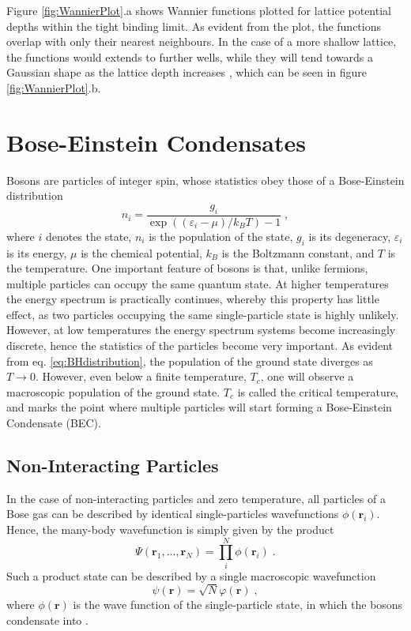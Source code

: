 Figure \ref{fig:WannierPlot}.a shows Wannier functions plotted for lattice potential depths within the tight binding limit. As evident from the plot, the functions overlap with only their nearest neighbours. In the case of a more shallow lattice, the functions would extends to further wells, while they will tend towards a Gaussian shape as the lattice depth increases \cite{greiner}, which can be seen in figure \ref{fig:WannierPlot}.b.



\section{Bose-Einstein Condensates}

Bosons are particles of integer spin, whose statistics obey those of a Bose-Einstein distribution
\begin{equation}
	n_i = \frac{g_i}{\exp \left( \left( \varepsilon_i -\mu \right) / k_B T \right) - 1} \; , \label{eq:BHdistribution}
\end{equation} 
where $i$ denotes the state, $n_i$ is the population of the state, $g_i$ is its degeneracy, $\varepsilon_i$ is its energy, $\mu$ is the chemical potential, $k_B$ is the Boltzmann constant, and $T$ is the temperature. One important feature of bosons is that, unlike fermions, multiple particles can occupy the same quantum state. At higher temperatures the energy spectrum is practically continues, whereby this property has little effect, as two particles occupying the same single-particle state is highly unlikely. However, at low temperatures the energy spectrum systems become increasingly discrete, hence the statistics of the particles become very important. As evident from eq. \eqref{eq:BHdistribution}, the population of the ground state diverges as $T \to 0$. However, even below a finite temperature, $T_c$, one will observe a macroscopic population of the ground state. $T_c$ is called the critical temperature, and marks the point where multiple particles will start forming a Bose-Einstein Condensate (BEC). \cite{pethick2002bose}

\subsection{Non-Interacting Particles}
In the case of non-interacting particles and zero temperature, all particles of a Bose gas can be described by identical single-particles wavefunctions $\phi (\boldsymbol{r}_i)$. Hence, the many-body wavefunction is simply given by the product 
\begin{equation}
	\Psi (\boldsymbol{r}_1 , \ldots , \boldsymbol{r}_N) = \prod_{i}^{N} \phi (\boldsymbol{r}_i) \; .
\end{equation}
Such a product state can be described by a single macroscopic wavefunction
\begin{equation}
	\psi (\boldsymbol{r}) = \sqrt{N} \varphi (\boldsymbol{r}) \; , \label{eq:psi_NIBEC}
\end{equation}
where $\phi (\boldsymbol{r})$ is the wave function of the single-particle state, in which the bosons condensate into \cite{PenroseOnsager}.

